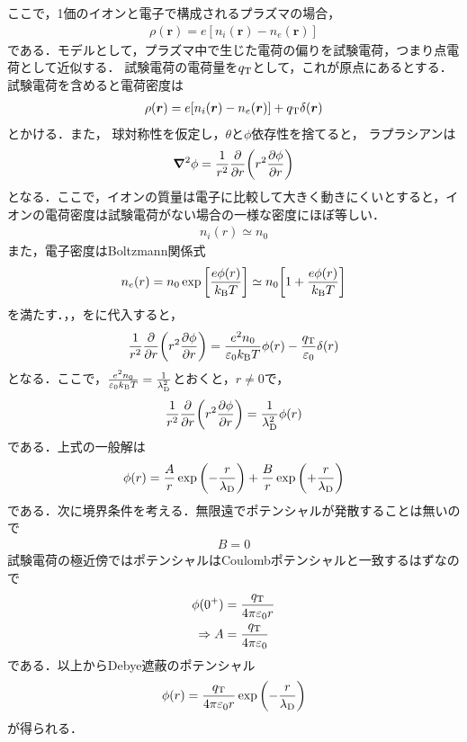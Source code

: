 \documentclass{report}
\begin{document}
    ここで，1価のイオンと電子で構成されるプラズマの場合，
    \begin{align}
      \rho(\bm{r}) = e[n_i(\bm{r}) - n_e(\bm{r})]
    \end{align}
    である．モデルとして，プラズマ中で生じた電荷の偏りを試験電荷，つまり点電荷として近似する．
    試験電荷の電荷量を$q_{\mathrm{T}}$として，これが原点にあるとする．
    試験電荷を含めると電荷密度は
    \begin{align}
      \rho(\bm{r}) = e[n_i(\bm{r}) - n_e(\bm{r})] + q_{\mathrm{T}}\delta(\bm{r}) \label{density-charge}
    \end{align}
    とかける．また，
    球対称性を仮定し，$\theta$と$\phi$依存性を捨てると，
    ラプラシアンは
    \begin{align}
      \grad^2\phi = \frac{1}{r^2}\pdv{r} \qty(r^2 \pdv{\phi}{r})
    \end{align}
    となる．ここで，イオンの質量は電子に比較して大きく動きにくいとすると，イオンの電荷密度は試験電荷がない場合の一様な密度にほぼ等しい．
    \begin{align}
      n_i(r) \simeq n_0 \label{density-ion}
    \end{align}
    また，電子密度はBoltzmann関係式
    \begin{align}
      n_e(r) = n_0\exp\qty[\frac{e\phi(r)}{k_{\mathrm{B}} T}] \simeq n_0\qty[1 + \frac{e\phi(r)}{k_{\mathrm{B}} T}] \label{density-e}
    \end{align}
    を満たす．，，をに代入すると，
    \begin{align}
      \frac{1}{r^2}\pdv{r}\qty(r^2\pdv{\phi}{r}) = \frac{e^2 n_0}{\varepsilon_0 k_{\mathrm{B}} T}\phi(r) - \frac{q_{\mathrm{T}}}{\varepsilon_0}\delta(r)
    \end{align}
    となる．ここで，$\frac{e^2 n_0}{\varepsilon_0 k_{\mathrm{B}} T} = \frac{1}{\lambda_{\mathrm{D}}^2}$とおくと，$r \neq 0$で，
    \begin{align}
      \frac{1}{r^2}\pdv{r}\qty(r^2\pdv{\phi}{r}) = \frac{1}{\lambda_{\mathrm{D}}^2}\phi(r)
    \end{align}
    である．上式の一般解は
    \begin{align}
      \phi(r) = \frac{A}{r}\exp\qty(-\frac{r}{\lambda_{\mathrm{D}}}) + \frac{B}{r}\exp\qty(+\frac{r}{\lambda_{\mathrm{D}}})
    \end{align}
    である．次に境界条件を考える．無限遠でポテンシャルが発散することは無いので
    \begin{align}
      B = 0
    \end{align}
    試験電荷の極近傍ではポテンシャルはCoulombポテンシャルと一致するはずなので
    \begin{align}
      \phi(0^{+}) &= \frac{q_{\mathrm{T}}}{4\pi\varepsilon_0 r}\\
      \Rightarrow A&= \frac{q_{\mathrm{T}}}{4\pi\varepsilon_0}
    \end{align}
    である．以上からDebye遮蔽のポテンシャル
    \begin{align}
      \phi(r) = \frac{q_{\mathrm{T}}}{4\pi\varepsilon_0 r}\exp\qty(-\frac{r}{\lambda_{\mathrm{D}}})
    \end{align}
    が得られる．
\end{document}
